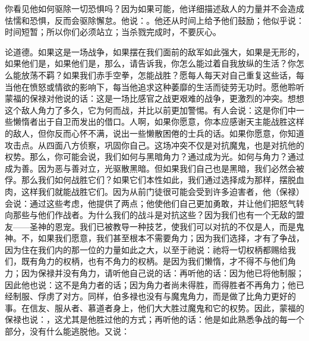 你看见他如何驱除一切恐惧吗？因为如果可能，他详细描述敌人的力量并不会造成怯懦和恐惧，反而会驱除懈怠。他说：。他还从时间上给予他们鼓励；他似乎说：时间短暂；所以你们必须站立；当杀戮完成时，不要灰心。\par

论道德。如果这是一场战争，如果摆在我们面前的敌军如此强大，如果是无形的，如果他们是，如果他们是，那么，请告诉我，你怎么能过着自我放纵的生活？你怎么能放荡不羁？如果我们赤手空拳，怎能战胜？愿每人每天对自己重复这些话，每当他在愤怒或情欲的影响下，每当他追求这种萎靡的生活而徒劳无功时。愿他聆听蒙福的保禄对他说的话：这是一场比感官之战更艰难的战争，更激烈的冲突。想想这个敌人角力了多久，它为何而战，并比以前更加警惕。有人会说：这是你们中一些懒惰者出于自卫而发出的借口。人啊，如果你愿意，你本应感谢天主能战胜这样的敌人，但你反而心怀不满，说出一些懒散困倦的士兵的话。如果你愿意，你知道攻击点。从四面八方侦察，巩固你自己。这场冲突不仅是对抗魔鬼，也是对抗他的权势。那么，你可能会说，我们如何与黑暗角力？通过成为光。如何与角力？通过成为善。因为恶与善对立，光驱散黑暗。但如果我们自己也是黑暗，我们必然会被俘。那么我们如何战胜它们？如果它们本性如此，我们通过选择成为那样，摆脱血肉，这样我们就能战胜它们。因为从前门徒很可能会受到许多迫害者，他（保禄）会说：通过这些考虑，他提供了两点；他使他们自己更加勇敢，并让他们把怒气转向那些与他们作战者。为什么我们的战斗是对抗这些？因为我们也有一个无敌的盟友——圣神的恩宠。我们已被教导一种技艺，使我们可以对抗的不仅是人，而是鬼神。不，如果我们愿意，我们甚至根本不需要角力；因为我们选择，才有了争战，因为住在我们内的那一位的力量如此之大，以至于祂说：祂将一切权柄都赐给我们，既有角力的权柄，也有不角力的权柄。是因为我们懒惰，才不得不与他们角力；因为保禄并没有角力，请听他自己说的话：再听他的话：因为他已将他制服；因此他也说：这不是角力者的话；因为角力者尚未得胜，而得胜者不再角力；他已经制服、俘虏了对方。同样，伯多禄也没有与魔鬼角力，而是做了比角力更好的事。在信友、服从者、慕道者身上，他们大大胜过魔鬼和它的权势。因此，蒙福的保禄也说：，这尤其是他胜过他的方式；再听他的话：他是如此熟悉争战的每一个部分，没有什么能逃脱他。又说：\par

